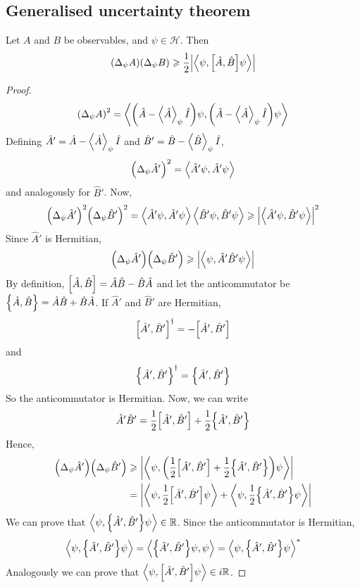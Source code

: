 \documentclass[a4paper,11pt]{article}
\begin{document}
\subsection{Generalised uncertainty theorem}
\begin{theorem}
	Let \( A \) and \( B \) be observables, and \( \psi \in \mathcal H \).
	Then
	\[
		\qty(\Delta_\psi A)\qty(\Delta_\psi B) \geqslant \frac{1}{2} \abs{\left\langle{\psi, \qty[\hat A, \hat B]\psi}\right\rangle}
	\]
\end{theorem}
\begin{proof}
	\[
		\qty(\Delta_\psi A)^2 = \left\langle{\qty(\hat A - \left\langle{\hat A}\right\rangle_\psi \hat I) \psi, \qty(\hat A - \left\langle{\hat A}\right\rangle_\psi \hat I) \psi}\right\rangle
	\]
	Defining \( \hat A' = \hat A - \left\langle{\hat A}\right\rangle_\psi \hat I \) and \( \hat B' = \hat B - \left\langle{\hat B}\right\rangle_\psi \hat I \),
	\[
		\qty(\Delta_\psi \hat A')^2 = \left\langle{\hat A' \psi, \hat A' \psi}\right\rangle
	\]
	and analogously for \( \hat B' \).
	Now,
	\[
		\qty(\Delta_\psi \hat A')^2 \qty(\Delta_\psi \hat B')^2 = \left\langle{\hat A' \psi, \hat A' \psi}\right\rangle \left\langle{\hat B' \psi, \hat B' \psi}\right\rangle \geqslant \abs{\left\langle{\hat A' \psi, \hat B' \psi}\right\rangle}^2
	\]
	Since \( \hat A' \) is Hermitian,
	\[
		\qty(\Delta_\psi \hat A') \qty(\Delta_\psi \hat B') \geqslant \abs{\left\langle{\psi, \hat A' \hat B' \psi}\right\rangle}
	\]
	By definition, \( \qty[\hat A, \hat B] = \hat A \hat B - \hat B \hat A \) and let the anticommutator be \( \qty{\hat A, \hat B} = \hat A \hat B + \hat B \hat A \).
	If \( \hat A' \) and \( \hat B' \) are Hermitian,
	\[
		\qty[\hat A', \hat B']^\dagger = - \qty[\hat A', \hat B']
	\]
	and
	\[
		\qty{\hat A', \hat B'}^\dagger = \qty{\hat A', \hat B'}
	\]
	So the anticommutator is Hermitian.
	Now, we can write
	\[
		\hat A' \hat B' = \frac{1}{2} \qty[\hat A', \hat B'] + \frac{1}{2} \qty{\hat A', \hat B'}
	\]
	Hence,
	\begin{align*}
		\qty(\Delta_\psi \hat A') \qty(\Delta_\psi \hat B') & \geqslant \abs{\left\langle{\psi, \qty(\frac{1}{2} \qty[\hat A', \hat B'] + \frac{1}{2} \qty{\hat A', \hat B'}) \psi}\right\rangle}           \\
		                                                    & = \abs{\left\langle{\psi, \frac{1}{2} \qty[\hat A', \hat B'] \psi}\right\rangle + \left\langle{\psi, \frac{1}{2} \qty{\hat A', \hat B'} \psi}\right\rangle}
	\end{align*}
	We can prove that \( \left\langle{\psi, \qty{\hat A', \hat B'} \psi}\right\rangle \in \mathbb R \).
	Since the anticommutator is Hermitian,
	\[
		\left\langle{\psi, \qty{\hat A', \hat B'} \psi}\right\rangle = \left\langle{\qty{\hat A', \hat B'} \psi, \psi}\right\rangle = \left\langle{\psi, \qty{\hat A', \hat B'} \psi}\right\rangle^*
	\]
	Analogously we can prove that \( \left\langle{\psi, \qty[\hat A', \hat B'] \psi}\right\rangle \in i\mathbb R \).

\end{proof}
\end{document}
